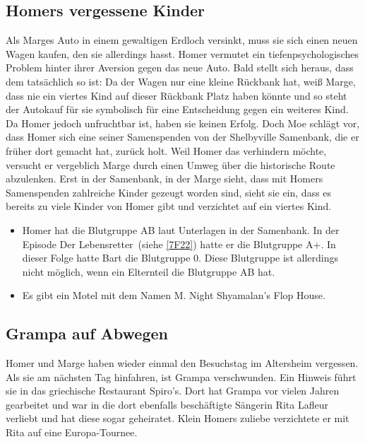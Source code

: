 
\subsection{Homers vergessene Kinder}
Als Marges Auto in einem gewaltigen Erdloch versinkt, muss sie sich einen neuen Wagen kaufen, den sie allerdings hasst. Homer vermutet ein tiefenpsychologisches Problem hinter ihrer Aversion gegen das neue Auto. Bald stellt sich heraus, dass dem tatsächlich so ist: Da der Wagen nur eine kleine Rückbank hat, weiß Marge, dass nie ein viertes Kind auf dieser Rückbank Platz haben könnte und so steht der Autokauf für sie symbolisch für eine Entscheidung gegen ein weiteres Kind. Da Homer jedoch unfruchtbar ist, haben sie keinen Erfolg. Doch Moe schlägt vor, dass Homer sich eine seiner Samenspenden von der Shelbyville Samenbank, die er früher dort gemacht hat, zurück holt. Weil Homer das verhindern möchte, versucht er vergeblich Marge durch einen Umweg über die historische Route abzulenken. Erst in der Samenbank, in der Marge sieht, dass mit Homers Samenspenden zahlreiche Kinder gezeugt worden sind, sieht sie ein, dass es bereits zu viele Kinder von Homer gibt und verzichtet auf ein viertes Kind.

\begin{itemize}
	\item Homer hat die Blutgruppe AB laut Unterlagen in der Samenbank. In der Episode \glqq Der Lebensretter\grqq\ (siehe \ref{7F22}) hatte er die Blutgruppe A+. In dieser Folge hatte Bart die Blutgruppe 0. Diese Blutgruppe ist allerdings nicht möglich, wenn ein Elternteil die Blutgruppe AB hat.
	\item Es gibt ein Motel mit dem Namen \glqq M. Night Shyamalan's Flop House\grqq .
\end{itemize}

\subsection{Grampa auf Abwegen}
Homer und Marge haben wieder einmal den Besuchstag im Altersheim vergessen. Als sie am nächsten Tag hinfahren, ist Grampa verschwunden. Ein Hinweis führt sie in das griechische Restaurant \glqq Spiro's\grqq{}. Dort hat Grampa vor vielen Jahren gearbeitet und war in die dort ebenfalls beschäftigte Sängerin Rita Lafleur verliebt und hat diese sogar geheiratet. Klein Homers zuliebe verzichtete er mit Rita auf eine Europa-Tournee.

